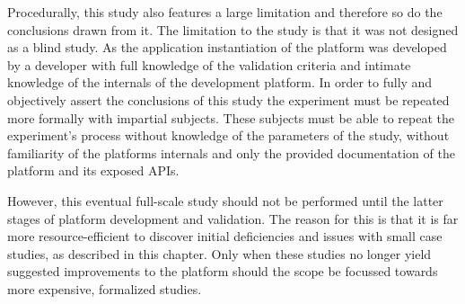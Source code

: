 Procedurally, this study also features a large limitation and therefore so do the conclusions drawn from it. The limitation to the study is that it was not designed as a blind study. As the application instantiation of the platform was developed by a developer with full knowledge of the validation criteria and intimate knowledge of the internals of the development platform. In order to fully and objectively assert the conclusions of this study the experiment must be repeated more formally with impartial subjects. These subjects must be able to repeat the experiment's process without knowledge of the parameters of the study, without familiarity of the platforms internals and only the provided documentation of the platform and its exposed APIs.

However, this eventual full-scale study should not be performed until the latter stages of platform development and validation. The reason for this is that it is far more resource-efficient to discover initial deficiencies and issues with small case studies, as described in this chapter. Only when these studies no longer yield suggested improvements to the platform should the scope be focussed towards more expensive, formalized studies.
